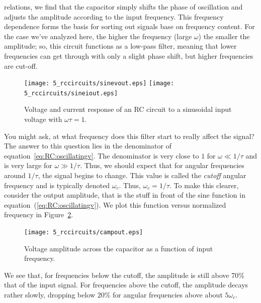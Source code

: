relations, we find that the capacitor simply shifts the phase of oscillation 
and adjusts the amplitude according to the input frequency. This frequency
dependence forms the basis for sorting out signals base on frequency content. 
For the case we've analyzed here, the higher the frequency (large $\omega$) the
smaller the amplitude; so, this circuit functions as a low-pass filter, meaning
that lower frequencies can get through with only a slight phase shift, but 
higher frequencies are cut-off. 
\begin{figure}[htb]
\centering 
\epsfxsize=8cm \texttt{[image: 5\_rccircuits/sinevout.eps]}
            \epsfxsize=8cm \texttt{[image: 5\_rccircuits/sineiout.eps]}
\caption{Voltage and current response of an RC circuit to a sinusoidal
input voltage with $\omega \tau = 1$.}
\label{fig:RC:oscillatingiv}
\end{figure}

You might ask, at what frequency does this filter start to really affect the 
signal? The answer to this question lies in the denominator of 
equation~\ref{eq:RC:oscillatingv}. The denominator is very close to $1$ for 
$\omega \ll 1/\tau$ and is very large for $\omega \gg 1/\tau$. Thus, we should
expect that for angular frequencies around $1/\tau$, the signal begins to
change. This value is called the {\em cutoff} angular frequency and is
typically denoted $\omega_c$. Thus, $\omega_c = 1/\tau$. To make this clearer,
consider the output amplitude, that is the stuff in front of the sine function
in equation~(\ref{eq:RC:oscillatingv}). We plot this function versus
normalized frequency in Figure~\ref{fig:RC:amplitude1}.
\begin{figure}[htb]
\centering 
\epsfxsize=10cm \texttt{[image: 5\_rccircuits/campout.eps]}
\caption{Voltage amplitude across the capacitor as a function of input 
frequency.}
\label{fig:RC:amplitude1}
\end{figure}
We see that, for frequencies below the cutoff, the amplitude is still above 
70\% that of the input signal. For frequencies above the cutoff, the amplitude 
decays rather slowly, dropping below 20\% for angular frequencies above about 
$5\omega_c$.

